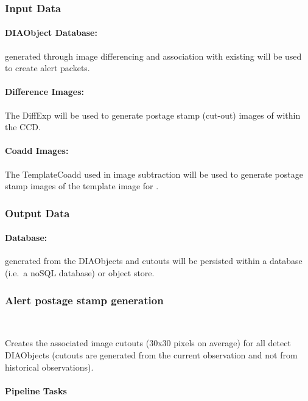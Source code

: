 \subsubsection{Input Data}
\label{sec:apADInput}

\paragraph*{DIAObject Database:} \DIAObjects generated through image differencing and association with existing \DIAObjects will be used to create alert packets.

\paragraph*{Difference Images:} The DiffExp will be used to  generate postage stamp (cut-out) images of \DIASources within the CCD. 

\paragraph*{Coadd Images:} The TemplateCoadd used in image subtraction will be used to  generate postage stamp images of the template image for \DIAObjects.


\subsubsection{Output Data}

\paragraph*{\VOEvent Database:} \VOEvents generated from the DIAObjects and cutouts will be persisted within a database (i.e.\ a noSQL database) or object store. 




\subsubsection{Alert postage stamp generation}~

Creates the associated image cutouts (30x30 pixels on average) for all detect DIAObjects (cutouts are generated from the current observation and not from historical observations).

\paragraph{Pipeline Tasks}

